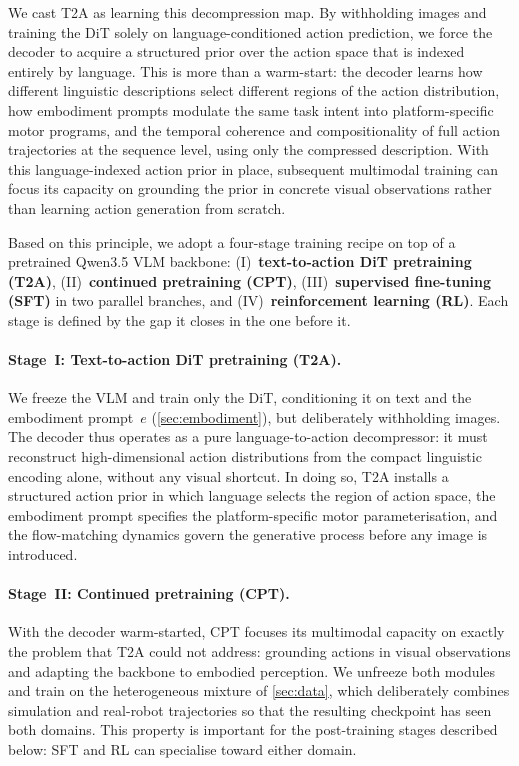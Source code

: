 \documentclass{llmxive}
\begin{document}
We cast T2A as learning this decompression map.
By withholding images and training the DiT solely on language-conditioned
action prediction, we force the decoder to acquire a structured prior over the
action space that is indexed entirely by language.
This is more than a warm-start: the decoder learns how different linguistic descriptions select different regions of the
action distribution, how embodiment prompts modulate the same task intent into
platform-specific motor programs, and the temporal coherence and compositionality of full action trajectories
at the sequence level, using only the compressed description.
With this language-indexed action prior in place, subsequent multimodal
training can focus its capacity on grounding the prior in concrete visual
observations rather than learning action generation from scratch.

Based on this principle, we adopt a four-stage training recipe on top of a
pretrained Qwen3.5 VLM backbone:
(I)~\textbf{text-to-action DiT pretraining (T2A)},
(II)~\textbf{continued pretraining (CPT)},
(III)~\textbf{supervised fine-tuning (SFT)} in two parallel branches, and
(IV)~\textbf{reinforcement learning (RL)}.
Each stage is defined by the gap it closes in the one before it.




\paragraph{Stage~I: Text-to-action DiT pretraining (T2A).}
We freeze the VLM and train only the DiT, conditioning it on text and the
  embodiment prompt~$e$ (\cref{sec:embodiment}), but deliberately withholding
  images.
  The decoder thus operates as a pure language-to-action decompressor: it
  must reconstruct high-dimensional action distributions from the compact
  linguistic encoding alone, without any visual shortcut.
  In doing so, T2A installs a structured action prior in which language
  selects the region of action space, the embodiment prompt specifies the
  platform-specific motor parameterisation, and the flow-matching dynamics
  govern the generative process before any image is introduced.


  \paragraph{Stage~II: Continued pretraining (CPT).}
  With the decoder warm-started, CPT focuses its multimodal capacity on exactly
  the problem that T2A could not address: grounding actions in visual
  observations and adapting the backbone to embodied perception.
  We unfreeze both modules and train on the heterogeneous mixture of
  \cref{sec:data}, which deliberately combines simulation and real-robot
  trajectories so that the resulting checkpoint has seen
  both domains.
  This property is important for the post-training stages described below:
  SFT and RL can specialise toward either domain.
\end{document}
